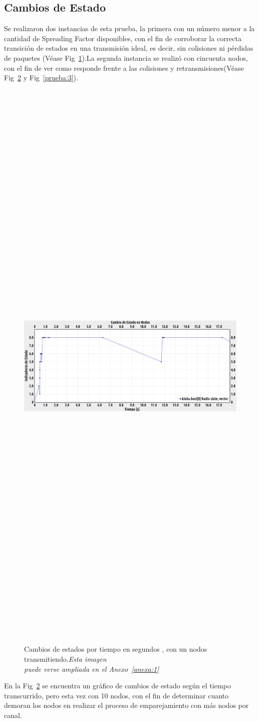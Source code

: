 \begin{justify}
\subsection{Cambios de Estado}
Se realizaron dos instancias de esta prueba, la primera con un número menor a la cantidad de Spreading Factor disponibles, con el fin de corroborar la correcta transición de estados en una transmisión ideal, es decir, sin colisiones ni pérdidas de paquetes (Véase Fig~\ref{prueba:1}).La segunda instancia se realizó con cincuenta nodos, con el fin de ver como responde frente a las colisiones y retransmisiones(Véase Fig~\ref{prueba:2} y Fig~\ref{prueba:3}).
\begin{figure}[!ht]
\centering
\includegraphics[width=13cm,height=30cm,keepaspectratio]{images/cambioestado1nodo-ideal.eps}
\caption{Cambios de estados por tiempo en segundos , con un nodos transmitiendo.\textit{Esta imagen \\
puede verse ampliada en el Anexo~\ref{anexa:1}}}
\label{prueba:1}
\end{figure}
En la Fig~\ref{prueba:2} se encuentra un gráfico de cambios de estado según el tiempo transcurrido, pero esta vez con 10 nodos, con el fin de determinar cuanto demoran los nodos en realizar el proceso de emparejamiento con más nodos por canal.
\begin{figure}[!ht]
\centering
\includegraphics[width=13cm,height=30cm,keepaspectratio]{images/cambioestado10nodos.eps}
\caption{Gráfico de Cambios de estados por tiempo en segundos , con diez nodos transmitiendo.\textit{Esta imagen puede verse ampliada en el Anexo~\ref{anexa:2}}}
\label{prueba:2}
\end{figure}
En la Fig~\ref{prueba:3} se presenta un gráfico de cambios de estado donde esta vez se encuentran 100 nodos distribuidos de forma uniforme en los distintos canales disponibles. \\
En estos gráfico se aprecia de que a medida de que aumenta la cantidad de nodos, el proceso de emparejamiento se ve ralentizado dado que
\end{justify}
